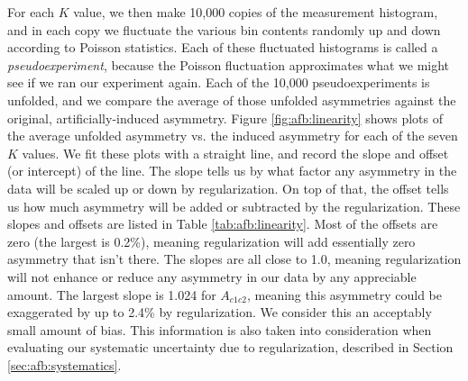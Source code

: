 For each $K$ value, we then make 10,000 copies of the measurement
histogram, and in each copy we fluctuate the various bin contents randomly up and down according to
Poisson statistics. Each of these fluctuated histograms is called a
\emph{pseudoexperiment}, because the Poisson fluctuation approximates
what we might see if we ran our experiment again. Each of
the 10,000 pseudoexperiments is unfolded, and we compare the average
of those unfolded asymmetries against the original,
artificially-induced asymmetry. Figure \ref{fig:afb:linearity}
shows plots of the average unfolded asymmetry vs. the induced asymmetry
for each of the seven $K$ values. We fit these plots
with a straight line, and record the slope and offset
(or intercept) of the line. The slope tells us by what
factor any asymmetry in the data will be scaled up or down by
regularization. On top of that, the offset tells us how much asymmetry
will be added or subtracted by the regularization. These slopes and
offsets are listed in Table \ref{tab:afb:linearity}. Most of the offsets are
zero (the largest is 0.2\%), meaning regularization will add
essentially zero asymmetry that isn't there. The slopes are all
close to 1.0, meaning regularization will not enhance or reduce any
asymmetry in our data by any appreciable amount. The largest slope is 1.024 for
$A_{c1c2}$, meaning this asymmetry could be exaggerated by up to
2.4\% by regularization. We consider this an acceptably small amount
of bias. This information is also taken into consideration when
evaluating our systematic uncertainty due to regularization, described
in Section \ref{sec:afb:systematics}.

